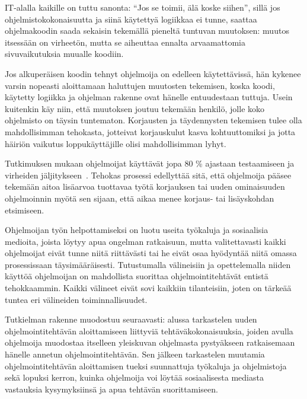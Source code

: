 \documentclass[finnish]{tktltiki2}
\theoremstyle{definition}
\theoremstyle{remark}
\begin{document}
IT-alalla kaikille on tuttu sanonta: ``Jos se toimii, älä koske siihen'', sillä jos ohjelmistokokonaisuutta ja siinä käytettyä logiikkaa ei tunne, saattaa ohjelmakoodin saada sekaisin tekemällä pieneltä tuntuvan muutoksen: muutos itsessään on virheetön, mutta se aiheuttaa ennalta arvaamattomia sivuvaikutuksia muualle koodiin.


Jos alkuperäisen koodin tehnyt ohjelmoija on edelleen käytettävissä, hän kykenee varsin nopeasti aloittamaan haluttujen muutosten tekemisen, koska koodi, käytetty logiikka ja ohjelman rakenne ovat hänelle entuudestaan tuttuja. Usein kuitenkin käy niin, että muutoksen joutuu tekemään henkilö, jolle koko ohjelmisto on täysin tuntematon.
Korjausten ja täydennysten tekemisen tulee olla mahdollisimman tehokasta, jotteivat korjauskulut kasva kohtuuttomiksi ja jotta häiriön vaikutus loppukäyttäjille olisi mahdollisimman lyhyt.

Tutkimuksen mukaan ohjelmoijat käyttävät jopa 80 \% ajastaan testaamiseen ja virheiden jäljitykseen~\cite{debugging-is-expensive}.
Tehokas prosessi edellyttää sitä, että ohjelmoija pääsee tekemään aitoa lisäarvoa tuottavaa työtä korjauksen tai uuden ominaisuuden ohjelmoinnin myötä sen sijaan, että aikaa menee korjaus- tai lisäyskohdan etsimiseen.

Ohjelmoijan työn helpottamiseksi on luotu useita työkaluja ja sosiaalisia medioita, joista löytyy apua ongelman ratkaisuun, mutta valitettavasti kaikki ohjelmoijat eivät tunne niitä riittävästi tai he eivät osaa hyödyntää niitä omassa prosessissaan täysimääräisesti. Tutustumalla välineisiin ja opettelemalla niiden käyttöä ohjelmoijan on mahdollista suorittaa ohjelmointitehtävät entistä tehokkaammin. Kaikki välineet eivät sovi kaikkiin tilanteisiin, joten on tärkeää tuntea eri välineiden toiminnallisuudet.

Tutkielman rakenne muodostuu seuraavasti: alussa tarkastelen uuden ohjelmointitehtävän aloittamiseen liittyviä tehtäväkokonaisuuksia, joiden avulla ohjelmoija muodostaa itselleen yleiskuvan ohjelmasta pystyäkseen ratkaisemaan hänelle annetun ohjelmointitehtävän. Sen jälkeen tarkastelen muutamia ohjelmointitehtävän aloittamisen tueksi suunnattuja työkaluja ja ohjelmistoja sekä lopuksi kerron, kuinka ohjelmoija voi löytää sosiaalisesta mediasta vastauksia kysymyksiinsä ja apua tehtävän suorittamiseen.
\end{document}
